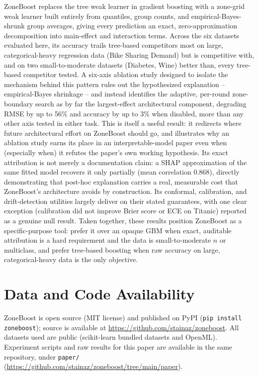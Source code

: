 \documentclass[11pt]{article}
\begin{document}
ZoneBoost replaces the tree weak learner in gradient boosting with a
zone-grid weak learner built entirely from quantiles, group counts, and
empirical-Bayes-shrunk group averages, giving every prediction an exact,
zero-approximation decomposition into main-effect and interaction terms.
Across the six datasets evaluated here, its accuracy trails tree-based
competitors most on large, categorical-heavy regression data (Bike Sharing
Demand) but is competitive with, and on two small-to-moderate datasets
(Diabetes, Wine) better than, every tree-based competitor tested. A
six-axis ablation study designed to isolate the mechanism behind this
pattern rules out the hypothesized explanation -- empirical-Bayes
shrinkage -- and instead identifies the adaptive, per-round zone-boundary
search as by far the largest-effect architectural component, degrading
RMSE by up to 56\% and accuracy by up to 3\% when disabled, more than any
other axis tested in either task. This is itself a useful result: it
redirects where future architectural effort on ZoneBoost should go, and
illustrates why an ablation study earns its place in an interpretable-model
paper even when (especially when) it refutes the paper's own working
hypothesis. Its exact attribution is not merely a documentation claim: a
SHAP approximation of the same fitted model recovers it only partially
(mean correlation $0.868$), directly demonstrating that post-hoc
explanation carries a real, measurable cost that ZoneBoost's architecture
avoids by construction. Its conformal, calibration, and drift-detection
utilities largely deliver on their stated guarantees, with one clear
exception (calibration did not improve Brier score or ECE on Titanic)
reported as a genuine null result. Taken together, these results position
ZoneBoost as a specific-purpose tool: prefer it over an opaque GBM when
exact, auditable attribution is a hard requirement and the data is
small-to-moderate $n$ or multiclass, and prefer tree-based boosting when
raw accuracy on large, categorical-heavy data is the only objective.

\section*{Data and Code Availability}
ZoneBoost is open source (MIT license) and published on PyPI
(\texttt{pip install zoneboost}); source is available at
\url{https://github.com/stainaz/zoneboost}. All datasets used are public
(scikit-learn bundled datasets and OpenML). Experiment scripts and raw
results for this paper are available in the same repository, under
\texttt{paper/} (\url{https://github.com/stainaz/zoneboost/tree/main/paper}).
\end{document}
